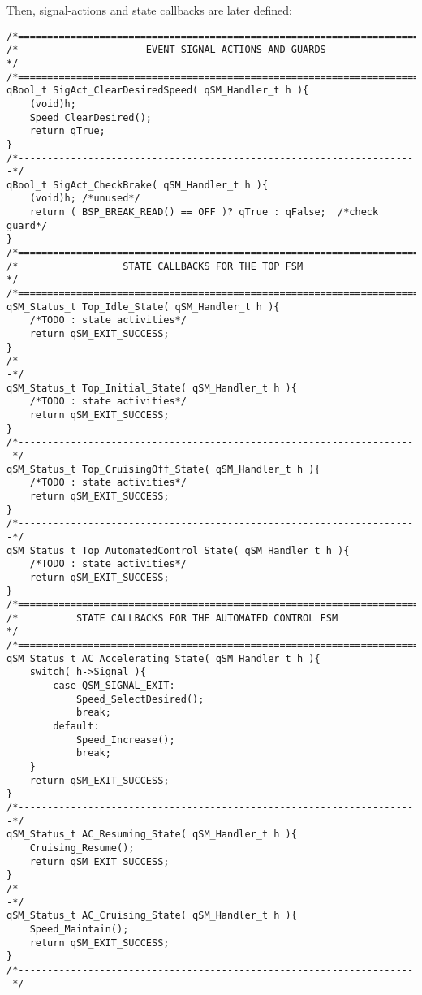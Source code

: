 Then, signal-actions and state callbacks are later defined:

\begin{lstlisting}[style=CStyle]
/*=======================================================================*/
/*                      EVENT-SIGNAL ACTIONS AND GUARDS                  */
/*=======================================================================*/
qBool_t SigAct_ClearDesiredSpeed( qSM_Handler_t h ){
    (void)h;
    Speed_ClearDesired();
    return qTrue;
}
/*---------------------------------------------------------------------*/
qBool_t SigAct_CheckBrake( qSM_Handler_t h ){
    (void)h; /*unused*/
    return ( BSP_BREAK_READ() == OFF )? qTrue : qFalse;  /*check guard*/
}
/*=======================================================================*/
/*                  STATE CALLBACKS FOR THE TOP FSM                      */
/*=======================================================================*/
qSM_Status_t Top_Idle_State( qSM_Handler_t h ){
    /*TODO : state activities*/
    return qSM_EXIT_SUCCESS;
}
/*---------------------------------------------------------------------*/
qSM_Status_t Top_Initial_State( qSM_Handler_t h ){
    /*TODO : state activities*/
    return qSM_EXIT_SUCCESS;
}
/*---------------------------------------------------------------------*/
qSM_Status_t Top_CruisingOff_State( qSM_Handler_t h ){
    /*TODO : state activities*/
    return qSM_EXIT_SUCCESS;
}
/*---------------------------------------------------------------------*/
qSM_Status_t Top_AutomatedControl_State( qSM_Handler_t h ){
    /*TODO : state activities*/
    return qSM_EXIT_SUCCESS;
}
/*=======================================================================*/
/*          STATE CALLBACKS FOR THE AUTOMATED CONTROL FSM                */
/*=======================================================================*/
qSM_Status_t AC_Accelerating_State( qSM_Handler_t h ){
    switch( h->Signal ){
        case QSM_SIGNAL_EXIT:
            Speed_SelectDesired();
            break;
        default:
            Speed_Increase();
            break;        
    }
    return qSM_EXIT_SUCCESS;
}
/*---------------------------------------------------------------------*/
qSM_Status_t AC_Resuming_State( qSM_Handler_t h ){
    Cruising_Resume();
    return qSM_EXIT_SUCCESS;
}
/*---------------------------------------------------------------------*/
qSM_Status_t AC_Cruising_State( qSM_Handler_t h ){
    Speed_Maintain();
    return qSM_EXIT_SUCCESS;
}
/*---------------------------------------------------------------------*/
\end{lstlisting}

